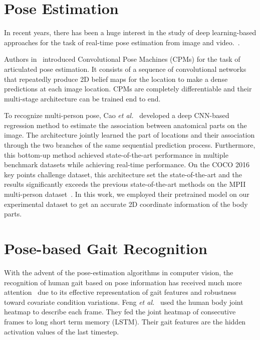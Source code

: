 \section{Pose Estimation} \label{sec:pose_estimation}
In recent years, there has been a huge interest in the study of deep learning-based approaches for the task of real-time pose estimation from image and video.~\cite{Wei_16, Cao_19}.  

Authors in~\cite{Wei_16} introduced Convolutional Pose Machines (CPMs) for the task of articulated pose estimation. It consists of a sequence of convolutional networks that repeatedly produce 2D belief maps for the location to make a dense predictions at each image location. CPMs are completely differentiable and their multi-stage architecture can be trained end to end. 

To recognize multi-person pose, Cao \textit{et al.}~\cite{Cao_19} developed a deep CNN-based regression method to estimate the association between anatomical parts on the image. The architecture jointly learned the part of locations and their association through the two branches of the same sequential prediction process. Furthermore, this bottom-up method achieved state-of-the-art performance in multiple benchmark datasets while achieving real-time performance. On the COCO 2016 key points challenge dataset, this architecture set the state-of-the-art and the results significantly exceeds the previous state-of-the-art methods on the MPII multi-person dataset~\cite{Cai_16}. In this work, we employed their pretrained model on our experimental dataset to get an accurate 2D coordinate information of the body parts. 


\section{Pose-based Gait Recognition} \label{sec:pose_based_gait_rec}
With the advent of the pose-estimation algorithms in computer vision, the recognition of human gait based on pose information has received much more attention~\cite{Feng_16, Liao_17, Liao_19} due to its effective representation of gait features and robustness toward covariate condition variations. Feng \textit{et al.}~\cite{Feng_16} used the human body joint heatmap to describe each frame. They fed the joint heatmap of consecutive frames to long short term memory (LSTM). Their gait features are the hidden activation values of the last timestep. 

